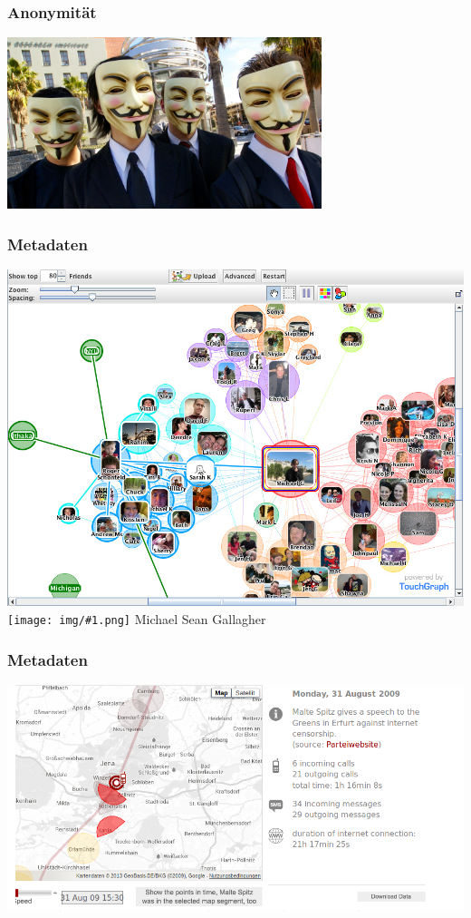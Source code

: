 \documentclass[12pt]{beamer}
\newcommand{\cc}[1]{\texttt{[image: img/\#1.png]}}
\begin{document}
\begin{frame}
    \frametitle{Anonymität}
    \begin{center}
      \includegraphics[height=5cm]{img/anonymous.jpg}
    \end{center}
\end{frame}

\begin{frame}
    \frametitle{Metadaten}
    \includegraphics[height=0.7\textheight]{img/socialgraph.jpg}
    {\small \cc{by-sa} Michael Sean Gallagher}
\end{frame}

\begin{frame}
    \frametitle{Metadaten}
    \includegraphics[height=0.7\textheight]{img/maltespitz.png}
\end{frame}
\end{document}
